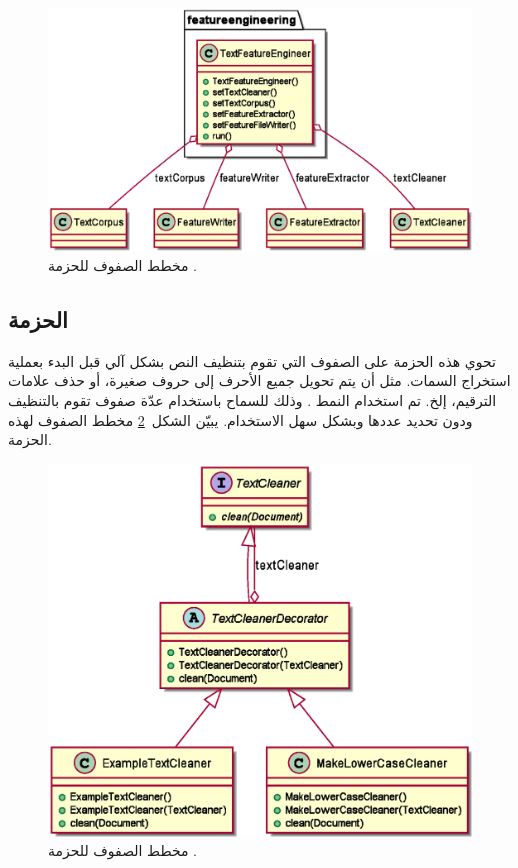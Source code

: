 \begin{figure}[htb]
	\centering
	\includegraphics[width=0.8\linewidth]{images/cd-featureengineering.eps}
	\caption{%
		مخطط الصفوف للحزمة .
	}
	\label{fig:cd:featureengineering}
\end{figure}




\subsection{الحزمة }
تحوي هذه الحزمة على الصفوف التي تقوم بتنظيف النص بشكل آلي قبل البدء بعملية استخراج السمات.
مثل أن يتم تحويل جميع الأحرف إلى حروف صغيرة، أو حذف علامات الترقيم، إلخ.
تم استخدام النمط .
وذلك للسماح باستخدام عدّة صفوف تقوم بالتنظيف ودون تحديد عددها وبشكل سهل الاستخدام.
يبيّن الشكل~\ref{fig:cd:cleaners} مخطط الصفوف لهذه الحزمة.

\begin{figure}[htb]
	\centering
	\includegraphics[width=0.75\linewidth]{images/cd-cleaners.eps}
	\caption{%
		مخطط الصفوف للحزمة .
	}
	\label{fig:cd:cleaners}
\end{figure}




